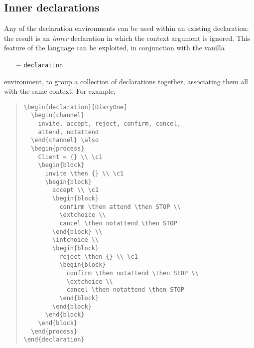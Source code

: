 \documentclass[fleqn,a4paper]{article}
\begin{document}
\subsection{Inner declarations}

Any of the declaration environments can be used within an existing
declaration: the result is an \emph{inner} declaration in which the
context argument is ignored.  This feature of the language can be
exploited, in conjunction with the vanilla
\begin{itemize}
\item[$-$] \verb=declaration=
\end{itemize}
environment, to group a collection of declarations together,
associating them all with the same context.  For example, 
\begin{quote}
\begin{verbatim}
\begin{declaration}[DiaryOne]
  \begin{channel}
    invite, accept, reject, confirm, cancel, 
    attend, notattend
  \end{channel} \also 
  \begin{process}
    Client = {} \\ \c1 
    \begin{block}
      invite \then {} \\ \c1 
      \begin{block}
        accept \\ \c1
        \begin{block}
          confirm \then attend \then STOP \\
          \extchoice \\
          cancel \then notattend \then STOP 
        \end{block} \\
        \intchoice \\
        \begin{block}
          reject \then {} \\ \c1
          \begin{block}
            confirm \then notattend \then STOP \\
            \extchoice \\
            cancel \then notattend \then STOP 
          \end{block}
        \end{block}
      \end{block}
    \end{block}
  \end{process}
\end{declaration}
\end{verbatim}
\end{quote}
\end{document}
